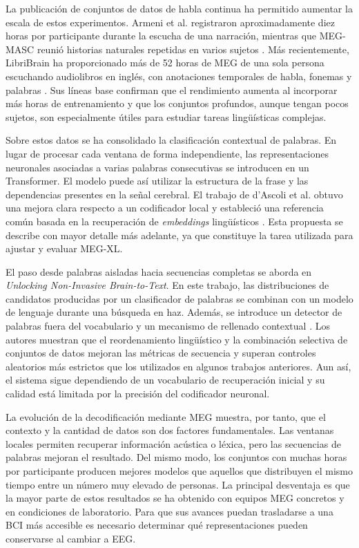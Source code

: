La publicación de conjuntos de datos de habla continua ha permitido aumentar la escala de estos experimentos. Armeni et al. registraron aproximadamente diez horas por participante durante la escucha de una narración, mientras que MEG-MASC reunió historias naturales repetidas en varios sujetos \cite{armeni2022meg,gwilliams2023megmasc}. Más recientemente, LibriBrain ha proporcionado más de 52 horas de MEG de una sola persona escuchando audiolibros en inglés, con anotaciones temporales de habla, fonemas y palabras \cite{ozdogan2025libribrain}. Sus líneas base confirman que el rendimiento aumenta al incorporar más horas de entrenamiento y que los conjuntos profundos, aunque tengan pocos sujetos, son especialmente útiles para estudiar tareas lingüísticas complejas.

Sobre estos datos se ha consolidado la clasificación contextual de palabras. En lugar de procesar cada ventana de forma independiente, las representaciones neuronales asociadas a varias palabras consecutivas se introducen en un Transformer. El modelo puede así utilizar la estructura de la frase y las dependencias presentes en la señal cerebral. El trabajo de d'Ascoli et al. obtuvo una mejora clara respecto a un codificador local y estableció una referencia común basada en la recuperación de \textit{embeddings} lingüísticos \cite{dascoli2024words}. Esta propuesta se describe con mayor detalle más adelante, ya que constituye la tarea utilizada para ajustar y evaluar MEG-XL.

El paso desde palabras aisladas hacia secuencias completas se aborda en \textit{Unlocking Non-Invasive Brain-to-Text}. En este trabajo, las distribuciones de candidatos producidas por un clasificador de palabras se combinan con un modelo de lenguaje durante una búsqueda en haz. Además, se introduce un detector de palabras fuera del vocabulario y un mecanismo de rellenado contextual \cite{jayalath2025unlocking}. Los autores muestran que el reordenamiento lingüístico y la combinación selectiva de conjuntos de datos mejoran las métricas de secuencia y superan controles aleatorios más estrictos que los utilizados en algunos trabajos anteriores. Aun así, el sistema sigue dependiendo de un vocabulario de recuperación inicial y su calidad está limitada por la precisión del codificador neuronal.

La evolución de la decodificación mediante MEG muestra, por tanto, que el contexto y la cantidad de datos son dos factores fundamentales. Las ventanas locales permiten recuperar información acústica o léxica, pero las secuencias de palabras mejoran el resultado. Del mismo modo, los conjuntos con muchas horas por participante producen mejores modelos que aquellos que distribuyen el mismo tiempo entre un número muy elevado de personas. La principal desventaja es que la mayor parte de estos resultados se ha obtenido con equipos MEG concretos y en condiciones de laboratorio. Para que sus avances puedan trasladarse a una BCI más accesible es necesario determinar qué representaciones pueden conservarse al cambiar a EEG.

